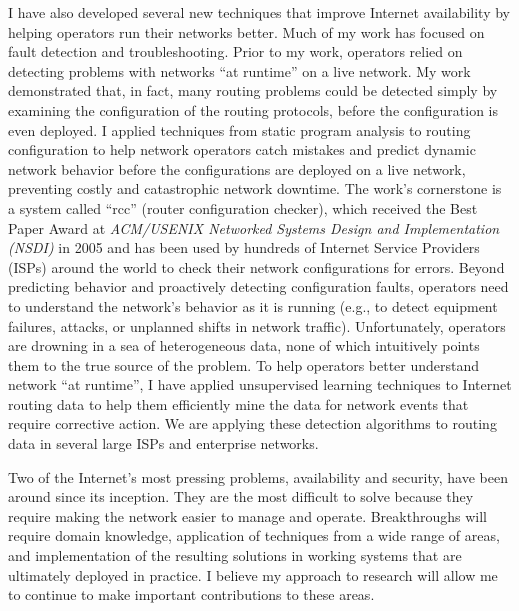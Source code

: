 I have also developed several new techniques that improve Internet
availability by helping operators run their networks better.  Much of my
work has focused on fault detection and troubleshooting.  Prior to my
work, operators relied on detecting problems with networks ``at
runtime'' on a live network.  My work demonstrated that, in fact, many
routing problems could be detected simply by examining the configuration
of the routing protocols, before the configuration is even deployed.  I
applied techniques from static program analysis to routing configuration
to help network operators catch mistakes and predict dynamic network
behavior before the configurations are deployed on a live network,
preventing costly and catastrophic network downtime. The work's
cornerstone is a system called ``rcc'' (router configuration checker),
which received the Best Paper Award at {\em ACM/USENIX Networked Systems
Design and Implementation (NSDI)} in 2005 and has been used by hundreds
of Internet Service Providers (ISPs) around the world to check their
network configurations for errors.  Beyond predicting behavior and
proactively detecting configuration faults, operators need to understand
the network's behavior as it is running (e.g., to detect equipment
failures, attacks, or unplanned shifts in network traffic).
Unfortunately, operators are drowning in a sea of heterogeneous data,
none of which intuitively points them to the true source of the problem.
To help operators better understand network ``at runtime'', I
have applied unsupervised learning techniques to Internet routing data
to help them efficiently mine the data for network events that require
corrective action.  We are applying these detection algorithms
to routing data in several large ISPs and enterprise networks.

Two of the Internet's most pressing problems, availability and security,
have been around since its inception.  They are the most difficult to
solve because they require making the network easier to manage and
operate.  Breakthroughs will require domain knowledge, application of
techniques from a wide range of areas, and 
implementation of the resulting solutions in working systems that are
ultimately deployed in practice.  I believe my approach to research will
allow me to continue to make important contributions to these areas.
